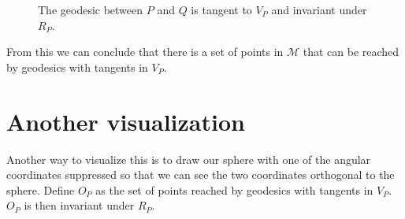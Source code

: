 \documentclass[11pt,table]{article}
\begin{document}
\begin{figure}[!h]
  \caption{The geodesic between $P$ and $Q$ is tangent to $V_P$ and invariant under $R_P$.}
  \label{fig:geodesic}
\end{figure}

From this we can conclude that there is a set of points in $\mathcal{M}$ that can be reached by geodesics with tangents in $V_P$.

\section{Another visualization}

Another way to visualize this is to draw our sphere with one of the angular coordinates suppressed so that we can see the two coordinates orthogonal to the sphere. Define $O_P$ as the set of points reached by geodesics with tangents in $V_P$. $O_P$ is then invariant under $R_P$.
\end{document}
